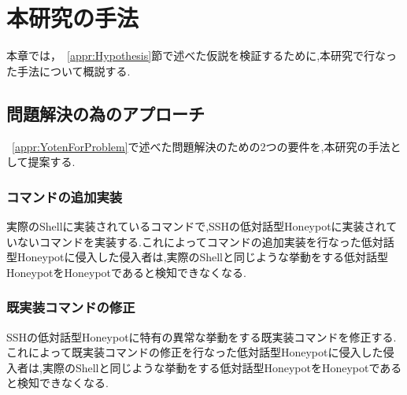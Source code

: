 \chapter{本研究の手法}
\label{meth}

本章では，~\ref{appr:Hypothesis}節で述べた仮説を検証するために,本研究で行なった手法について概説する.

\section{問題解決の為のアプローチ}
\label{meth:appr}
 ~\ref{appr:YotenForProblem}で述べた問題解決のための2つの要件を,本研究の手法として提案する.

 \subsection{コマンドの追加実装}
実際のShellに実装されているコマンドで,SSHの低対話型Honeypotに実装されていないコマンドを実装する.これによってコマンドの追加実装を行なった低対話型Honeypotに侵入した侵入者は,実際のShellと同じような挙動をする低対話型HoneypotをHoneypotであると検知できなくなる.

 \subsection{既実装コマンドの修正}
 SSHの低対話型Honeypotに特有の異常な挙動をする既実装コマンドを修正する.これによって既実装コマンドの修正を行なった低対話型Honeypotに侵入した侵入者は,実際のShellと同じような挙動をする低対話型HoneypotをHoneypotであると検知できなくなる.



